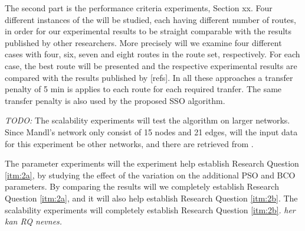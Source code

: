 The second part is the performance criteria experiments, Section xx. Four different instances of the will be studied, each having different number of routes, in order for our experimental results to be straight comparable with the results published by other researchers. More precisely will we examine four different cases with four, six, seven and eight routes in the route set, respectively. For each case, the best route will be presented and the respective experimental results are compared with the results published by [refs]. In all these approaches a transfer penalty of 5 min is applies to each route for each required tranfer. The same transfer penalty is also used by the proposed SSO algorithm. 

\emph{\color{blue} TODO: } The scalability experiments will test the algorithm on larger networks. Since Mandl's network only consist of 15 nodes and 21 edges, will the input data for this experiment be other networks, and there are retrieved from \citet{mumford13}. 

The parameter experiments will the experiment help establish Research Question \vref{itm:2a}, by studying the effect of the variation on the additional PSO and BCO parameters. By comparing the results will we completely establish Research Question \vref{itm:2a}, and it will also help establish Research Question \vref{itm:2b}. The scalability experiments will completely establish Research Question \vref{itm:2b}. \emph{\color{blue} her kan RQ nevnes.  }



